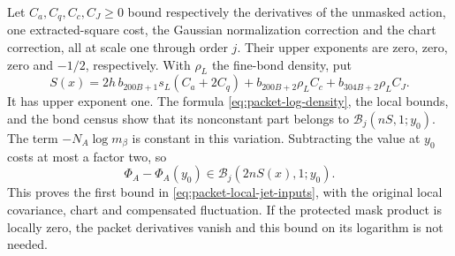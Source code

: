 Let $C_a,C_q,C_c,C_J\ge0$ bound respectively the derivatives of
the unmasked action, one extracted-square cost, the Gaussian
normalization correction and the chart correction, all at scale
one through order $j$. Their upper exponents are zero, zero,
zero and $-1/2$, respectively. With $\rho_L$ the fine-bond density,
put
\[
 S(x)=2h\,b_{200B+1}s_L(C_a+2C_q)
       +b_{200B+2}\rho_L C_c+b_{304B+2}\rho_L C_J.
\]
It has upper exponent one. The formula
\eqref{eq:packet-log-density}, the local bounds, and the bond
census show that its nonconstant part belongs to
$\mathcal B_j(nS,1;y_0)$. The term $-N_A\log m_\beta$ is
constant in this variation. Subtracting the value at $y_0$ costs
at most a factor two, so
\begin{equation}\label{eq:action-packet-log-jets}
 \Phi_A-\Phi_A(y_0)\in\mathcal B_j(2nS(x),1;y_0).
\end{equation}
This proves the first bound in
\eqref{eq:packet-local-jet-inputs}, with the original local
covariance, chart and compensated fluctuation. If the protected
mask product is locally zero, the packet derivatives vanish and
this bound on its logarithm is not needed.
